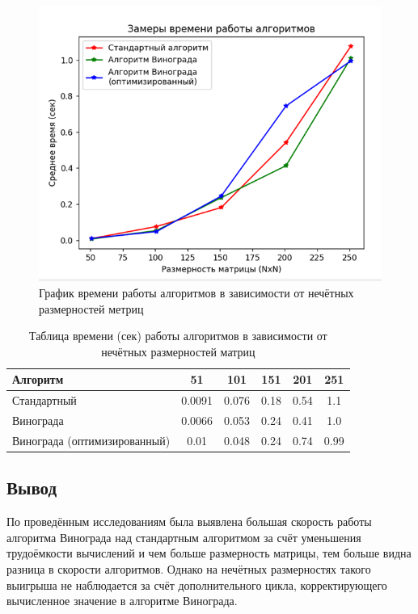 \begin{figure}[H]
    \centering
    \includegraphics[width=1\textwidth]{img/graph_odd.png}
    \caption{График времени работы алгоритмов в зависимости от нечётных размерностей метриц}
    \label{fig:graph_odd} %
\end{figure}

\begin{table}[H]
    \centering
    \begin{tabular}{|l|c|c|c|c|c|}
        \hline
        \textbf{Алгоритм} & \textbf{51} & \textbf{101} & \textbf{151} & \textbf{201} & \textbf{251}\\
        \hline
        Стандартный & 0.0091 & 0.076 & 0.18 & 0.54 & 1.1 \\
        Винограда & 0.0066 & 0.053 & 0.24 & 0.41 & 1.0 \\
        Винограда (оптимизированный) & 0.01 & 0.048 & 0.24 & 0.74 & 0.99 \\
        \hline
    \end{tabular}
    \caption{Таблица времени (сек) работы алгоритмов в зависимости от нечётных размерностей матриц}
    \label{table:table_odd}
\end{table}

\subsection*{Вывод}

\hspace{1.25cm}
По проведённым исследованиям была выявлена большая скорость работы алгоритма Винограда над стандартным алгоритмом за счёт уменьшения трудоёмкости вычислений и чем больше размерность матрицы, тем больше видна разница в скорости алгоритмов. Однако на нечётных размерностях такого выигрыша не наблюдается за счёт дополнительного цикла, корректирующего вычисленное значение в алгоритме Винограда.

\newpage